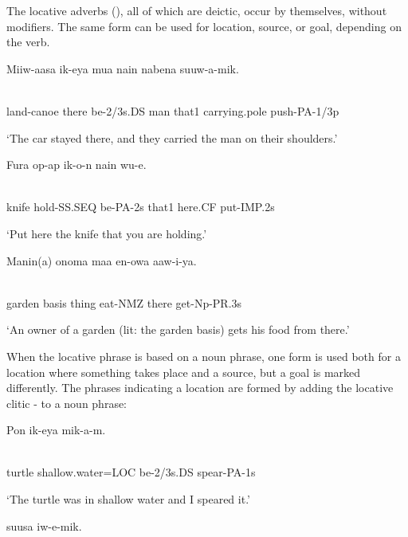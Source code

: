 The locative adverbs (), all of which are deictic, occur by themselves, without modifiers. The same form can be used for location, source, or goal, depending on the verb.

\ea%
\label{ex:x870}
\gll Miiw-aasa    ik-eya  mua  nain  nabena  suuw-a-mik. \\
      \\
\glt
\z

land-canoe  there  be-2/3s.DS  man  that1  carrying.pole  push-PA-1/3p

`The car stayed there, and they carried the man on their shoulders.'

\ea%
\label{ex:x871}
\gll Fura  op-ap  ik-o-n  nain    wu-e. \\
      \\
\glt
\z

knife  hold-SS.SEQ  be-PA-2s  that1  here.CF  put-IMP.2s

`Put here the knife that you are holding.'

\ea%
\label{ex:x1833}
\gll Manin(a)  onoma  maa  en-owa    aaw-i-ya. \\
      \\
\glt
\z

garden  basis  thing  eat-NMZ  there  get-Np-PR.3s

`An owner of a garden (lit: the garden basis) gets his food from there.'

When the locative phrase is based on a noun phrase, one form is used both for  a location where something takes place and a source, but a goal is marked differently.  The phrases indicating a location are formed by adding the locative clitic \nobreakdash-  to a noun phrase:

\ea%
\label{ex:x856}
\gll Pon   ik-eya  mik-a-m. \\
      \\
\glt
\z

turtle  shallow.water=LOC  be-2/3s.DS  spear-PA-1s

`The turtle was in shallow water and I speared it.'

\ea%
\label{ex:x857}
\gll {}  suusa  iw-e-mik. \\
      \\
\glt
\z


